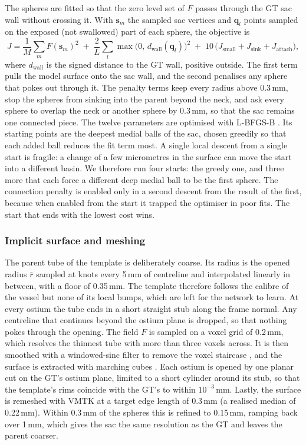 The spheres are fitted so that the zero level set of $F$ passes through the GT sac wall without crossing it. With $\mathbf{s}_m$ the sampled sac vertices and $\mathbf{q}_l$ points sampled on the exposed (not swallowed) part of each sphere, the objective is
\begin{equation}
    J = \frac{1}{M}\sum_m F(\mathbf{s}_m)^2 \;+\; \frac{2}{L}\sum_l \max\big(0,\, d_\text{wall}(\mathbf{q}_l)\big)^2 \;+\; 10\,\big(J_\text{small} + J_\text{sink} + J_\text{attach}\big),
\end{equation}
where $d_\text{wall}$ is the signed distance to the GT wall, positive outside. The first term pulls the model surface onto the sac wall, and the second penalises any sphere that pokes out through it. The penalty terms keep every radius above 0.3\,mm, stop the spheres from sinking into the parent beyond the neck, and ask every sphere to overlap the neck or another sphere by 0.3\,mm, so that the sac remains one connected piece. The twelve parameters are optimised with L-BFGS-B \citep{byrd1995}. Its starting points are the deepest medial balls of the sac, chosen greedily so that each added ball reduces the fit term most. A single local descent from a single start is fragile: a change of a few micrometres in the surface can move the start into a different basin. We therefore run four starts: the greedy one, and three more that each force a different deep medial ball to be the first sphere. The connection penalty is enabled only in a second descent from the result of the first, because when enabled from the start it trapped the optimiser in poor fits. The start that ends with the lowest cost wins.

\subsubsection*{Implicit surface and meshing}

The parent tube of the template is deliberately coarse. Its radius is the opened radius $\bar{r}$ sampled at knots every 5\,mm of centreline and interpolated linearly in between, with a floor of 0.35\,mm. The template therefore follows the calibre of the vessel but none of its local bumps, which are left for the network to learn. At every ostium the tube ends in a short straight stub along the frame normal. Any centreline that continues beyond the ostium plane is dropped, so that nothing pokes through the opening. The field $F$ is sampled on a voxel grid of 0.2\,mm, which resolves the thinnest tube with more than three voxels across. It is then smoothed with a windowed-sinc filter to remove the voxel staircase \citep{taubin1996}, and the surface is extracted with marching cubes \citep{lorensen1987}. Each ostium is opened by one planar cut on the GT's ostium plane, limited to a short cylinder around its stub, so that the template's rims coincide with the GT's to within $10^{-3}$\,mm. Lastly, the surface is remeshed with VMTK at a target edge length of 0.3\,mm (a realised median of 0.22\,mm). Within 0.3\,mm of the spheres this is refined to 0.15\,mm, ramping back over 1\,mm, which gives the sac the same resolution as the GT and leaves the parent coarser.


